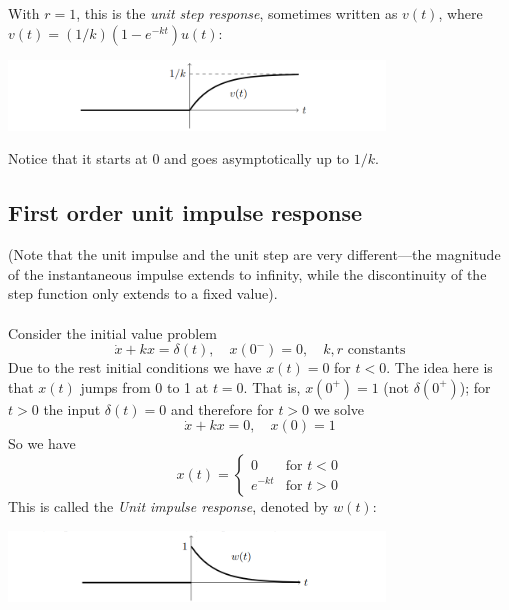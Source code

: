 \documentclass{report}
\begin{document}
With $r=1$, this is the \textit{unit step response}, sometimes written as $v(t)$, where 
$v(t)=(1/k)(1-e^{-kt})u(t)$:
\begin{center}
\includegraphics[width=10cm]{51}\\
\end{center}
Notice that it starts at 0 and goes asymptotically up to $1/k$.
\newpage

\subsection{First order unit impulse response}
(Note that the unit impulse and the unit step are very different---the magnitude of the instantaneous
impulse extends to infinity, while the discontinuity of the step function only extends to a fixed value).\\
\vspace{1mm}\\
Consider the initial value problem
\begin{equation*}
\dot{x}+kx=\delta(t),\quad x(0^-)=0,\quad k,r\text{ constants}
\end{equation*}
Due to the rest initial conditions we have $x(t)=0$ for $t<0$. The idea here is that $x(t)$ jumps from 0 to 1 
at $t=0$. That is, $x(0^+)=1$ (not $\delta(0^+)$); for $t>0$ the input $\delta(t)=0$ and therefore for $t>0$ we 
solve
\begin{equation*}
\dot{x}+kx=0,\quad x(0)=1
\end{equation*}
So we have
\begin{equation*}
x(t)=\begin{cases}
0&\text{for }t<0\\
e^{-kt}&\text{for }t>0\end{cases}
\end{equation*}
This is called the \textit{Unit impulse response}, denoted by $w(t)$:
\begin{center}
\includegraphics[width=10cm]{52}\\
\end{center}
\end{document}
